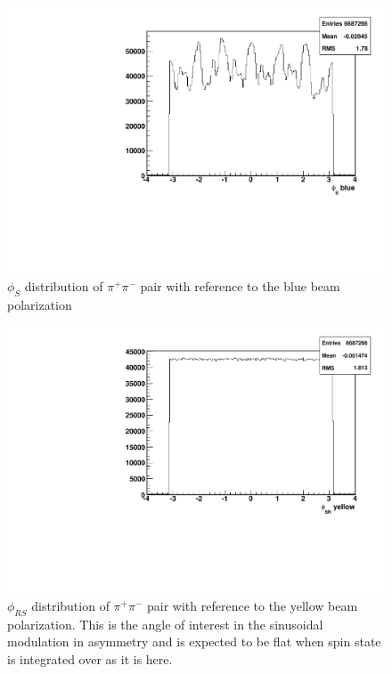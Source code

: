 \documentclass[abstract = on,listof=totoc, bibliography=totoc]{scrreprt}
\newcommand{\phis}{\phi_{S}}
\newcommand{\phirs}{\phi_{RS}}
\newcommand{\pip}{\pi^+}
\newcommand{\pim}{\pi^-}
\newcommand{\pair}{$\pip\pim$ }
\begin{document}
\begin{figure}
\begin{center}
\includegraphics[width = .8\textwidth]{hPhiSb}
\caption[$\phis$ distribution of \pair pair with reference to the blue beam polarization]{$\phis$ distribution of \pair pair with reference to the blue beam polarization}
\label{fig:phisb}
\end{center}
\end{figure}


\begin{figure}
\begin{center}
\includegraphics[width = .8\textwidth]{hPhiSRy}
\caption[$\phirs$ distribution of \pair pair with reference to the yellow beam polarization]{$\phirs$ distribution of \pair pair with reference to the yellow beam polarization. This is the angle of interest in the sinusoidal modulation in asymmetry and is expected to be flat when spin state is integrated over as it is here.}
\label{fig:phisry}
\end{center}
\end{figure}
\end{document}
